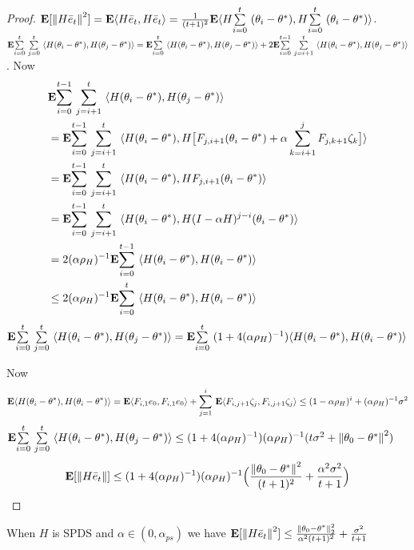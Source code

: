 \begin{proof}
$\E[\norm{H\eb_t}^2]=\E\ip{H\eb_t,H\eb_t}=\frac{1}{(t+1)^2}\E\ip{H\ous{\sum}{i=0}{t}(\theta_i-\ts),H\ous{\sum}{i=0}{t}(\theta_i-\ts)}$.
$\E\ous{\sum}{i=0}{t}\ous{\sum}{j=0}{t}\ip{H(\theta_i-\theta^*),H(\theta_j-\theta^*)}=\E\ous{\sum}{i=0}{t}\ip{H(\theta_i-\theta^*),H(\theta_j-\theta^*)}+ 2\E\ous{\sum}{i=0}{t-1}\ous{\sum}{j=i+1}{t}\ip{H(\theta_i-\theta^*),H(\theta_j-\theta^*)}$. Now
\begin{align}\label{inter}
&\E\ous{\sum}{i=0}{t-1}\ous{\sum}{j=i+1}{t}\ip{H(\theta_i-\theta^*),H(\theta_j-\theta^*)}\nn\\
&=\E\ous{\sum}{i=0}{t-1}\ous{\sum}{j=i+1}{t}\ip{H(\theta_i-\theta^*),H\big[F_{j,i+1} (\theta_i-\theta^*)+\alpha\sum_{k=i+1}^j F_{j,k+1}\zeta_{k}\big]}\nn\\
&=\E\ous{\sum}{i=0}{t-1}\ous{\sum}{j=i+1}{t}\ip{H(\theta_i-\theta^*),H F_{j,i+1} (\theta_i-\theta^*)}\nn\\
&=\E\ous{\sum}{i=0}{t-1}\ous{\sum}{j=i+1}{t}\ip{H(\theta_i-\theta^*),H(I-\alpha H)^{j-i} (\theta_i-\theta^*)}\nn\\
&=2(\alpha\rho_H)^{-1}\E\ous{\sum}{i=0}{t-1}\ip{H(\theta_i-\theta^*),H (\theta_i-\theta^*)}\nn\\
&\leq2(\alpha\rho_H)^{-1}\E\ous{\sum}{i=0}{t}\ip{H(\theta_i-\theta^*),H (\theta_i-\theta^*)}\nn\\
\end{align}
$\E\ous{\sum}{i=0}{t}\ous{\sum}{j=0}{t}\ip{H(\theta_i-\theta^*),H(\theta_j-\theta^*)}=\E\ous{\sum}{i=0}{t}(1+4(\alpha\rho_H)^{-1})\ip{H(\theta_i-\theta^*),H(\theta_i-\theta^*)}$

Now
\begin{align*}
\E\ip{H(\theta_i-\theta^*),H(\theta_i-\theta^*)}=\E\ip{F_{i,1}e_0,F_{i,1}e_0}+\ous{\sum}{j=1}{i}\E\ip{F_{i,j+1}\zeta_j,F_{i,j+1}\zeta_j}
\leq (1-\alpha\rho_H)^i+ (\alpha\rho_H)^{-1}\sigma^2
\end{align*}
$\E\ous{\sum}{i=0}{t}\ous{\sum}{j=0}{t}\ip{H(\theta_i-\theta^*),H(\theta_j-\theta^*)}\leq (1+4(\alpha\rho_H)^{-1}) (\alpha\rho_H)^{-1}(t\sigma^2+\norm{\theta_0-\ts}^2)$
\begin{align}
\E[\norm{H\eb_t}]\leq (1+4(\alpha\rho_H)^{-1}) (\alpha\rho_H)^{-1} \Big(\frac{\norm{\theta_0-\ts}^2}{(t+1)^2}+ \frac{\alpha^2\sigma^2}{t+1} \Big)
\end{align}
\end{proof}

\begin{theorem}
When $H$ is SPDS and $\alpha\in (0,\alpha_{ps})$ we have $\E[\norm{H\eb_t}^2]\leq \frac{\norm{\theta_0-\ts}^2_2}{\alpha^2(t+1)^2}+\frac{\sigma^2}{t+1}$
\end{theorem}

